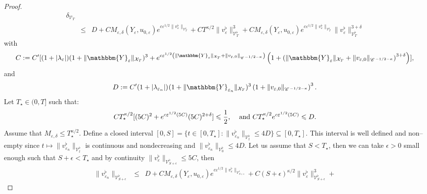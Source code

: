 \begin{proof}
\begin{eqnarray*}
{    \delta}_{\mathcal{V}_T}\\
    & \leqslant & D + CM_{\varepsilon, \delta} (Y_{\varepsilon}, u_{0,
    \varepsilon}) e^{c \varepsilon^{1 / 2} \| v^{\flat}_{\varepsilon}
    \|_{\mathcal{V}_T^{\flat}}} + CT^{\kappa / 2} \| v^{\flat}_{\varepsilon}
    \|_{\mathcal{V}^{\flat}_T}^3 + CM_{\varepsilon, \delta} (Y_{\varepsilon},
    u_{0, \varepsilon}) e^{c \varepsilon^{1 / 2} \| v^{\flat}_{\varepsilon}
    \|_{\mathcal{V}_T^{\flat}}} \| v^{\flat}_{\varepsilon}
    \|_{\mathcal{V}^{\flat}_T}^{3 + \delta}
  \end{eqnarray*}
  with
  \[ C \assign C' [(1 + | \lambda_{\varepsilon} |) (1 + \|
     \mathbbm{Y}_{\varepsilon} \|_{\mathcal{X}_T})^3 + e^{c \varepsilon^{1 /
     2} \left( \| \mathbbm{Y}_{\varepsilon} \|_{\mathcal{X}_T} + \|
     v_{\varepsilon, 0} \|_{\CC^{- 1 / 2 - \kappa}} \right)} \left( 1 + \left(
     \| \mathbbm{Y}_{\varepsilon} \|_{\mathcal{X}_T} + \| v_{\varepsilon, 0}
     \|_{\CC^{- 1 / 2 - \kappa}} \right)^{3 + \delta} \right)], \]
  and
  \[ D \assign C' (1 + | \lambda_{\varepsilon_n} |)_{}  (1 + \|
     \mathbbm{Y}_{\varepsilon_n} \|_{\mathcal{X}_T})^3 \left( 1 + \|
     v_{\varepsilon, 0} \|_{\CC^{- 1 / 2 - \kappa}} \right)^3 . \]
  Let $T_{\star} \in (0, T]$ such that:
  \[ CT_{\star}^{\kappa / 2} [(5 C)^2 + e^{c \varepsilon^{1 / 2} (5 C)} (5
     C)^{2 + \delta}] \leqslant \frac{1}{2} \text{, \quad and }
     CT_{\star}^{\kappa / 2} e^{c \varepsilon^{1 / 2} (5 C)} \leqslant D. \]
  Assume that $M_{\varepsilon, \delta} \leqslant T_{\star}^{\kappa / 2}$.
  Define a closed interval $[0, S] = \{t \in [0, T_{\star}] : \|
  v^{\flat}_{\varepsilon_n} \|_{\mathcal{V}_t^{\flat}} \leqslant 4 D\}
  \subseteq [0, T_{\star}]$. This interval is well defined and non--empty
  since $t \mapsto \| v^{\flat}_{\varepsilon_n} \|_{\mathcal{V}_t^{\flat}}$ is
  continuous and nondecreasing and $\| v^{\flat}_{\varepsilon_n}
  \|_{\mathcal{V}_0^{\flat}} \leqslant 4 D$. Let us assume that $S <
  T_{\star}$, then we can take $\epsilon > 0$ small enough such that $S +
  \epsilon < T_{\star}$ and by continuity $\| v^{\flat}_{\varepsilon}
  \|_{\mathcal{V}_{S + \epsilon}^{\flat}} \leqslant 5 C$, then
  \begin{eqnarray*}
    \| v^{\flat}_{\varepsilon_n} \|_{\mathcal{V}_{S + \epsilon}^{\flat}} &
    \leqslant & D + CM_{\varepsilon, \delta} (Y_{\varepsilon}, u_{0,
    \varepsilon}) e^{c \varepsilon^{1 / 2} \| v^{\flat}_{\varepsilon}
    \|_{\mathcal{V}_{S + \epsilon}^{\flat}}} + C (S + \epsilon)^{\kappa / 2}
    \| v^{\flat}_{\varepsilon} \|_{\mathcal{V}^{\flat}_{S + \epsilon}}^3 +

\end{eqnarray*}
\end{proof}

